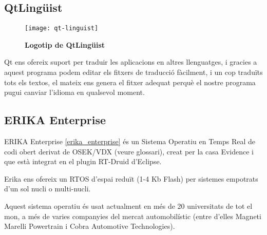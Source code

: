 \subsection{QtLingüist}\label{cap:tec:soft:qtlinguist}


\begin{wrapfigure}{r}{0.3\textwidth}
	\centering
	\texttt{[image: qt-linguist]}
	\caption[Logotip de QtLingüist]{{\small\textbf{Logotip de QtLingüist}}}
	\label{qt-linguist}
\end{wrapfigure}

Qt ens ofereix suport per traduir les aplicacions en altres llenguatges, i gracies a aquest programa podem editar els fitxers de traducció fàcilment, i un cop traduïts tots els textos, el mateix \Qtlinguist ens genera el fitxer adequat perquè el nostre programa \DCSMonitor pugui canviar l'idioma en qualsevol moment.

\subsection{ERIKA Enterprise}\label{cap:tec:soft:erika}


ERIKA Enterprise \ref{erika_enterprise} és un Sistema Operatiu en Temps Real de codi obert derivat de OSEK/VDX (veure glossari), creat per la casa Evidence i que està integrat en el plugin RT-Druid d'Eclipse.

Erika ens ofereix un RTOS d'espai reduït (1-4 Kb Flash) per sistemes empotrats d'un sol nucli o multi-nucli.

Aquest sistema operatiu és usat actualment en més de 20 universitats de tot el mon, a més de varies companyies del mercat automobilístic (entre d'elles Magneti Marelli Powertrain i Cobra Automotive Technologies).


